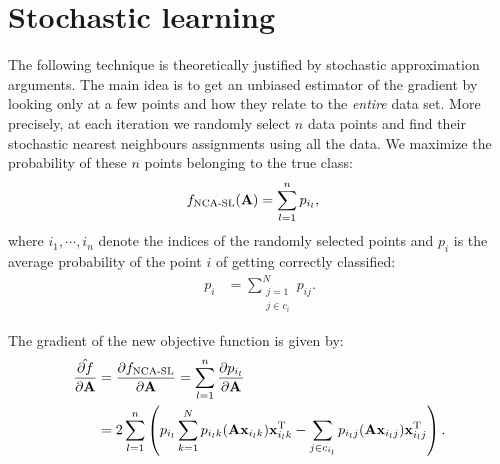 

\section{Stochastic learning}
\label{sec:stochastic-learning}

The following technique is theoretically justified by stochastic approximation arguments. The main idea is to get an unbiased estimator of the gradient by
looking only at a few points and how they relate to the \textit{entire} data set. More precisely, at each iteration we randomly select $n$ data points and find their stochastic nearest neighbours assignments using all the data. We maximize the probability of these $n$ points belonging to the true class:
\begin{align}
 	f_\text{NCA-SL}(\mathbf{A}) &= \sum_{l=1}^n p_{i_l},
\end{align}
where $i_1,\cdots,i_n$ denote the indices of the randomly selected points and $p_i$ is the average probability of the point $i$ of getting correctly classified:
\begin{align}
 p_i &= \sum_{\substack{j=1\\j\in c_i}}^Np_{ij}.
\end{align}

The gradient of the new objective function is given by:
\begin{align}
	\frac{\hat{\partial f}}{\partial \mathbf{A}}&=\frac{\partial f_\text{NCA-SL}}{\partial \mathbf{A}} = \sum_{l=1}^{n} \frac{\partial
p_{i_l}}{\partial \mathbf{A}}\\
	&=2\sum_{l=1}^{n}\left(p_{i_l}\sum_{k=1}^Np_{{i_l}k}(\mathbf{A}\mathbf{x}_{{i_l}k})\mathbf{x}_{{i_l}k}^{\textrm{T}} -
	\sum_{j\in c_{i_l}}p_{{i_l}j}(\mathbf{A}\mathbf{x}_{{i_l}j})\mathbf{x}_{{i_l}j}^{\textrm{T}} \right).
	\label{eq:snca-grad}
\end{align}

